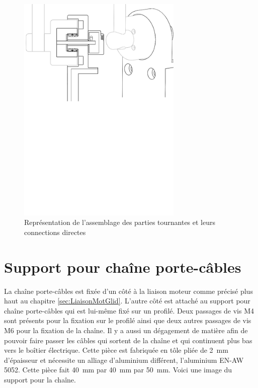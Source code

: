 \begin{figure}[H]
  \centering
  \includegraphics[width = 0.7\textwidth]{assets/figures/AssemblagePartieTournante.svg}
  \caption{Représentation de l'assemblage des parties tournantes et leurs connections directes}
  \label{fig:AssPartieTour}
\end{figure}


\section{Support pour chaîne porte-câbles}\label{sec:SupChainCable}
La chaîne porte-câbles est fixée d'un côté à la liaison moteur comme précisé plus haut au chapitre \ref{sec:LiaisonMotGlid}. L'autre côté est
attaché au support pour chaîne porte-câbles qui est lui-même fixé sur un profilé. Deux passages de vis M4 sont présents pour la fixation sur
le profilé ainsi que deux autres passages de vis M6 pour la fixation de la chaîne. Il y a aussi un dégagement de matière afin de pouvoir faire
passer les câbles qui sortent de la chaîne et qui continuent plus bas vers le boîtier électrique. Cette pièce est fabriquée en tôle pliée de
2~mm d'épaisseur et nécessite un alliage d'aluminium différent, l'aluminium EN-AW 5052. Cette pièce fait 40~mm par 40~mm par 50~mm.
Voici une image du support pour la chaîne.

